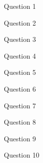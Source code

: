 \begin{questionblock}
Question 1
\end{questionblock}
\begin{questionblock}
Question 2
\end{questionblock}
\begin{questionblock}
Question 3
\end{questionblock}
\begin{questionblock}
Question 4
\end{questionblock}
\begin{questionblock}
Question 5
\end{questionblock}
\begin{questionblock}
Question 6
\end{questionblock}
\begin{questionblock}
Question 7
\end{questionblock}
\begin{questionblock}
Question 8
\end{questionblock}
\begin{questionblock}
Question 9
\end{questionblock}
\begin{questionblock}
Question 10
\end{questionblock}
